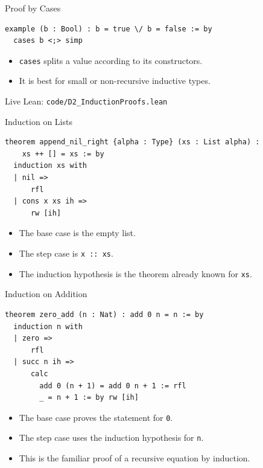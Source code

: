 ﻿\documentclass[aspectratio=169,11pt]{beamer}
\newcommand{\leanfile}[1]{\vfill{\small\color{gray}Live Lean: \texttt{#1}}}
\begin{document}
\begin{frame}[fragile]{Proof by Cases}
  \begin{lstlisting}
example (b : Bool) : b = true \/ b = false := by
  cases b <;> simp
  \end{lstlisting}

  \begin{itemize}
    \item \texttt{cases} splits a value according to its constructors.
    \item It is best for small or non-recursive inductive types.
  \end{itemize}

  \leanfile{code/D2\_InductionProofs.lean}
\end{frame}

\begin{frame}[fragile]{Induction on Lists}
  \begin{lstlisting}
theorem append_nil_right {alpha : Type} (xs : List alpha) :
    xs ++ [] = xs := by
  induction xs with
  | nil =>
      rfl
  | cons x xs ih =>
      rw [ih]
  \end{lstlisting}

  \begin{itemize}
    \item The base case is the empty list.
    \item The step case is \texttt{x :: xs}.
    \item The induction hypothesis is the theorem already known for \texttt{xs}.
  \end{itemize}
\end{frame}

\begin{frame}[fragile]{Induction on Addition}
  \begin{lstlisting}
theorem zero_add (n : Nat) : add 0 n = n := by
  induction n with
  | zero =>
      rfl
  | succ n ih =>
      calc
        add 0 (n + 1) = add 0 n + 1 := rfl
        _ = n + 1 := by rw [ih]
  \end{lstlisting}

  \begin{itemize}
    \item The base case proves the statement for \texttt{0}.
    \item The step case uses the induction hypothesis for \texttt{n}.
    \item This is the familiar proof of a recursive equation by induction.
  \end{itemize}
\end{frame}
\end{document}
